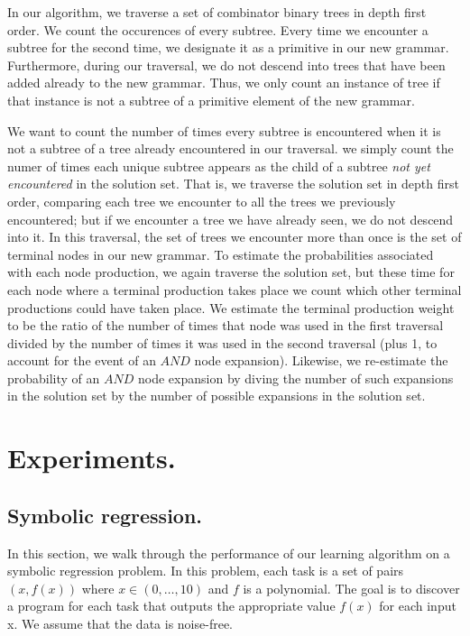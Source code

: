 \documentclass{article}
\begin{document}
In our algorithm, we traverse a set of combinator binary trees in
depth first order. We count the occurences of every subtree. Every
time we encounter a subtree for the second time, we designate it as a
primitive in our new grammar. Furthermore, during our traversal, we do
not descend into trees that have been added already to the new
grammar. Thus, we only count an instance of tree if that instance is
not a subtree of a primitive element of the new grammar.

We want to count the number of
times every subtree is encountered when it is not a subtree of a tree
already encountered in our traversal. we simply count the numer of
times each unique subtree appears as the child of a subtree \emph{not
  yet encountered} in the solution set. That is, we traverse the
solution set in depth first order, comparing each tree we encounter to
all the trees we previously encountered; but if we encounter a tree we
have already seen, we do not descend into it. In this traversal, the
set of trees we encounter more than once is the set of terminal nodes
in our new grammar. To estimate the probabilities associated with each
node production, we again traverse the solution set, but these time
for each node where a terminal production takes place we count which
other terminal productions could have taken place. We estimate the
terminal production weight to be the ratio of the number of times that
node was used in the first traversal divided by the number of times it
was used in the second traversal (plus 1, to account for the event of
an $AND$ node expansion). Likewise, we re-estimate the probability of
an $AND$ node expansion by diving the number of such expansions in the
solution set by the number of possible expansions in the solution set.

\section{Experiments.}
\subsection{Symbolic regression.}

In this section, we walk through the performance of our learning
algorithm on a symbolic regression problem. In this problem,
each task is a set of pairs $ (x, f(x))$ where $x \in (0, \dots, 10)$
and $f$ is a polynomial. The goal is to discover a program for each
task that outputs the appropriate value $f(x)$ for each input x. We
assume that the data is noise-free.
\end{document}
